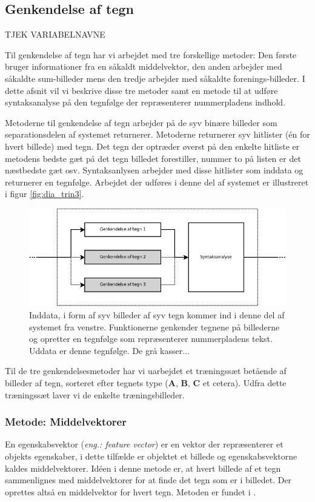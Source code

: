 \subsection{Genkendelse af tegn}
\label{sec_monster}

TJEK VARIABELNAVNE

Til genkendelse af tegn har vi arbejdet med tre forskellige metoder: Den første bruger informationer fra en såkaldt middelvektor, den anden arbejder med såkaldte sum-billeder mens den tredje arbejder med såkaldte forenings-billeder. I dette afsnit vil vi beskrive disse tre metoder samt en metode til at udføre syntaksanalyse på den tegnfølge der repræsenterer nummerpladens indhold.

Metoderne til genkendelse af tegn arbejder på de syv binære billeder som separationsdelen af systemet returnerer. Metoderne returnerer syv hitlister (én for hvert billede) med tegn. Det tegn der optræder øverst på den enkelte hitliste er metodens bedste gæt på det tegn billedet forestiller, nummer to på listen er det næstbedste gæt osv. Syntaksanlysen arbejder med disse hitlister som inddata og returnerer en tegnfølge. Arbejdet der udføres i denne del af systemet er illustreret i figur \vref{fig:dia_trin3}.

\begin{figure}[htp]
\centering
\includegraphics[width=12cm]{system/illu/dia_trin3.png} 
\caption{Inddata, i form af syv billeder af syv tegn kommer ind i denne del af systemet fra venstre. Funktionerne genkender tegnene på billederne og opretter en tegnfølge som repræsenterer nummerpladens tekst. Uddata er denne tegnfølge. De grå kasser...}
\label{fig:dia_trin3}
\end{figure}

Til de tre genkendelsesmetoder har vi uarbejdet et træningssæt betående af billeder af tegn, sorteret efter tegnets type (\textbf{A}, \textbf{B}, \textbf{C} et cetera). Udfra dette træningssæt laver vi de enkelte træningsbilleder.

\subsubsection*{Metode: Middelvektorer}
En egenskabsvektor (\textit{eng.: feature vector}) er en vektor der repræsenterer et objekts egenskaber, i dette tilfælde er objektet et billede og egenskabsvektorne kaldes middelvektorer. Idéen i denne metode er, at hvert billede af et tegn sammenlignes med middelvektorer for at finde det tegn som er i billedet. Der oprettes altså en middelvektor for hvert tegn. Metoden er fundet i \cite{arth}.

